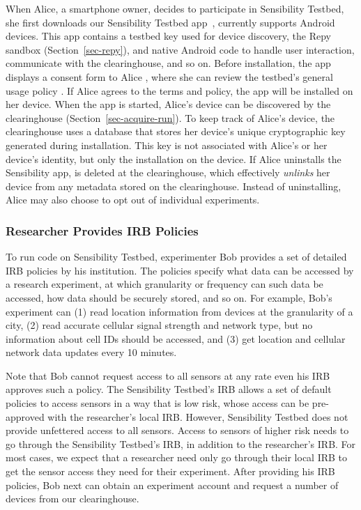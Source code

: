 When Alice, a smartphone owner, decides to participate in
Sensibility Testbed, she first downloads our Sensibility Testbed
app~\cite{sensibility-app}, currently supports Android devices.
This app contains a testbed key  used for 
device discovery, the Repy sandbox (Section~\ref{sec-repy}), 
and native Android code to handle user interaction, communicate 
with the clearinghouse, and so on. Before installation, the app displays a
consent form to Alice , where she can review
the testbed's general usage policy . If Alice
agrees to the terms and policy, the app will be installed on her
device. When the app is started, Alice's device can be
discovered by the clearinghouse (Section~\ref{sec-acquire-run}). 
To keep track of Alice's device, the
clearinghouse uses a database that stores her device's unique
cryptographic key  generated during
installation. This key is not associated with Alice's or her
device's identity, but only the installation on the device. If
Alice uninstalls the Sensibility app,  is
deleted at the clearinghouse, which effectively \textit{unlinks}
her device from any metadata stored on the clearinghouse.
Instead of uninstalling, Alice may also choose to opt out of
individual experiments.

\subsubsection{Researcher Provides IRB
Policies}\label{sec-irb-policy}

To run code on Sensibility Testbed, experimenter Bob provides a
set of detailed IRB policies by his institution. The policies specify 
what data can be accessed by a research experiment, at which 
granularity or frequency can such data be accessed, how data 
should be securely stored, and so on.
For example, Bob's experiment can (1) read location information
from devices at the granularity of a city, (2) read accurate
cellular signal strength and network type, but no information
about cell IDs should be accessed, and (3) get location and
cellular network data updates every 10 minutes. 

Note that Bob cannot request access to all sensors at any rate
even his IRB approves such a policy. The Sensibility Testbed's
IRB allows a set of default policies to access sensors in a
way that is low risk, whose access can be pre-approved with the
researcher's local IRB. However, Sensibility Testbed does not
provide unfettered access to all sensors. Access to sensors of
higher risk needs to go through the Sensibility Testbed's IRB,
in addition to the researcher's IRB. For most cases, we expect
that a researcher need only go through their local IRB to get
the sensor access they need for their experiment. After
providing his IRB policies, Bob next can obtain an experiment
account and request a number of devices from our clearinghouse.

